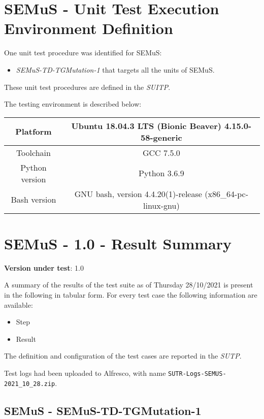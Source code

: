 
\chapter{SEMuS - Unit Test Execution Environment Definition}
\label{ch:semus:def}

One unit test procedure was identified for SEMuS:
\begin{itemize}
  \item {\emph{SEMuS-TD-TGMutation-1} that targets all the units of SEMuS}.
\end{itemize}

These unit test procedures are defined in the \emph{SUITP}.

The testing environment is described below:

\begin{center}
\begin{tabular}{ |c|c| }
 \hline
 Platform & Ubuntu 18.04.3 LTS (Bionic Beaver) 4.15.0-58-generic \\
 \hline
 Toolchain & GCC 7.5.0 \\
 \hline
 Python version & Python 3.6.9 \\
 \hline
 Bash version & GNU bash, version 4.4.20(1)-release (x86\_64-pc-linux-gnu) \\
 \hline
\end{tabular}
\end{center}


\chapter{SEMuS - 1.0 - Result Summary}
\label{ch:semus:res}

\textbf{Version under test}: 1.0

A summary of the results of the test suite as of Thursday 28/10/2021 is present in the following in tabular form.
For every test case the following information are available:
\begin{itemize}
  \item Step
  \item Result
\end{itemize}

The definition and configuration of the test cases are reported in the \emph{SUTP}.

Test logs had been uploaded to Alfresco, with name \texttt{SUTR-Logs-SEMUS-2021\_10\_28.zip}.

\section{SEMuS - SEMuS-TD-TGMutation-1}



\clearpage
